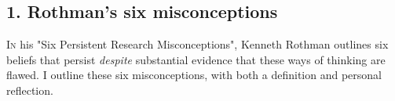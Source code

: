 \documentclass[11pt]{article}
\begin{document}
\begin{multicols}{2} 

\subsection*{1. Rothman's six misconceptions}

\lettrine[nindent=0em,lines=3]{I}{n} his "Six Persistent Research Misconceptions", Kenneth Rothman outlines six beliefs that persist \emph{despite} substantial evidence that these ways of thinking are flawed.\cite{Rothman2014} I outline these six misconceptions, with both a definition and personal reflection.


\end{multicols}
\end{document}
